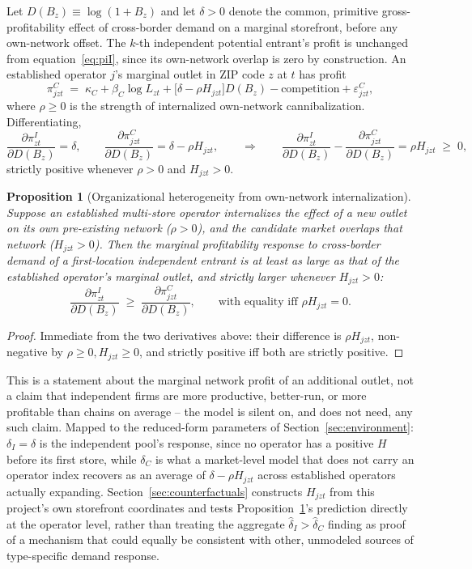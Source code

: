 \documentclass[english,12pt]{article}
\newtheorem{proposition}{Proposition}
\begin{document}
Let $D(B_z)\equiv\log(1+B_z)$ and let $\delta>0$ denote the common, primitive gross-profitability effect of cross-border demand on a marginal storefront, before any own-network offset. The $k$-th independent potential entrant's profit is unchanged from equation~\eqref{eq:piI}, since its own-network overlap is zero by construction. An established operator $j$'s marginal outlet in ZIP code $z$ at $t$ has profit
\begin{equation}
\pi^C_{jzt} \;=\; \kappa_C + \beta_C\log L_{zt} + \big[\delta - \rho H_{jzt}\big]D(B_z) - \text{competition} + \varepsilon^C_{jzt}, \label{eq:piC_micro}
\end{equation}
where $\rho\ge 0$ is the strength of internalized own-network cannibalization. Differentiating,
\[
\frac{\partial \pi^I_{zt}}{\partial D(B_z)} = \delta, \qquad \frac{\partial \pi^C_{jzt}}{\partial D(B_z)} = \delta - \rho H_{jzt}, \qquad \Longrightarrow \qquad \frac{\partial \pi^I_{zt}}{\partial D(B_z)} - \frac{\partial \pi^C_{jzt}}{\partial D(B_z)} = \rho H_{jzt} \;\ge\; 0,
\]
strictly positive whenever $\rho>0$ and $H_{jzt}>0$.

\begin{proposition}[Organizational heterogeneity from own-network internalization]
\label{prop:cannibalization}
Suppose an established multi-store operator internalizes the effect of a new outlet on its own pre-existing network ($\rho>0$), and the candidate market overlaps that network ($H_{jzt}>0$). Then the marginal profitability response to cross-border demand of a first-location independent entrant is at least as large as that of the established operator's marginal outlet, and strictly larger whenever $H_{jzt}>0$:
\[
\frac{\partial \pi^I_{zt}}{\partial D(B_z)} \;\ge\; \frac{\partial \pi^C_{jzt}}{\partial D(B_z)}, \qquad \text{with equality iff } \rho H_{jzt}=0.
\]
\end{proposition}
\begin{proof}
Immediate from the two derivatives above: their difference is $\rho H_{jzt}$, non-negative by $\rho\ge0, H_{jzt}\ge0$, and strictly positive iff both are strictly positive.
\end{proof}

This is a statement about the marginal network profit of an additional outlet, not a claim that independent firms are more productive, better-run, or more profitable than chains on average -- the model is silent on, and does not need, any such claim. Mapped to the reduced-form parameters of Section~\ref{sec:environment}: $\delta_I=\delta$ is the independent pool's response, since no operator has a positive $H$ before its first store, while $\delta_C$ is what a market-level model that does not carry an operator index recovers as an average of $\delta-\rho H_{jzt}$ across established operators actually expanding. Section~\ref{sec:counterfactuals} constructs $H_{jzt}$ from this project's own storefront coordinates and tests Proposition~\ref{prop:cannibalization}'s prediction directly at the operator level, rather than treating the aggregate $\hat\delta_I>\hat\delta_C$ finding as proof of a mechanism that could equally be consistent with other, unmodeled sources of type-specific demand response.
\end{document}
